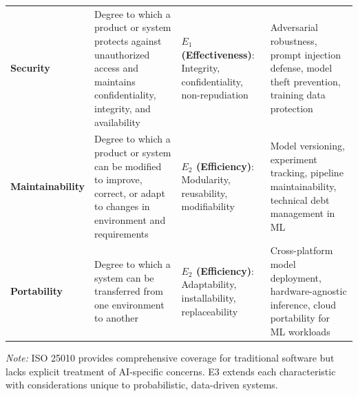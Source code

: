 \begin{table}[t]
\begin{tabularx}{\textwidth}{@{}l X X X@{}}
\addlinespace

\textbf{Security} & 
Degree to which a product or system protects against unauthorized access and maintains confidentiality, integrity, and availability &
\textbf{$E_1$ (Effectiveness)}: Integrity, confidentiality, non-repudiation &
Adversarial robustness, prompt injection defense, model theft prevention, training data protection \\

\addlinespace

\textbf{Maintainability} & 
Degree to which a product or system can be modified to improve, correct, or adapt to changes in environment and requirements &
\textbf{$E_2$ (Efficiency)}: Modularity, reusability, modifiability &
Model versioning, experiment tracking, pipeline maintainability, technical debt management in ML \\

\addlinespace

\textbf{Portability} & 
Degree to which a system can be transferred from one environment to another &
\textbf{$E_2$ (Efficiency)}: Adaptability, installability, replaceability &
Cross-platform model deployment, hardware-agnostic inference, cloud portability for ML workloads \\

\bottomrule
\end{tabularx}

\vspace{0.5em}
\noindent\textit{Note:} ISO 25010 provides comprehensive coverage for traditional software but lacks explicit treatment of AI-specific concerns. E3 extends each characteristic with considerations unique to probabilistic, data-driven systems.

\end{table}
